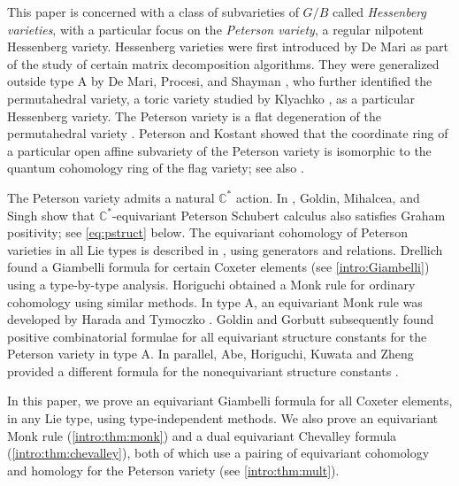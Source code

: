 \documentclass[10pt]{article}
\numberwithin{thm}{section}
\theoremstyle{definition}
\theoremstyle{remark}
\newcommand{\IC}{\mathbb C}
\begin{document}
This paper is concerned with a class of subvarieties of $G/B$  called {\em Hessenberg varieties}, with a particular focus  on the {\em Peterson variety}, a regular nilpotent Hessenberg variety.
Hessenberg varieties were first introduced by De Mari \cite{MR2636295} as part of the study of certain matrix decomposition algorithms.
They were generalized outside type A by De Mari, Procesi, and Shayman \cite{MR1043857},
who further identified the permutahedral variety, a toric variety studied by Klyachko \cite{klyachko85,klyachko95}, as a particular Hessenberg variety.
The Peterson variety is a flat degeneration of the permutahedral variety \cite{abe.fujita.zeng, MR2609167}.
Peterson \cite{peterson:notes} and Kostant \cite{kostant:flag} showed that the coordinate ring of a particular open affine subvariety of the Peterson variety is isomorphic to the quantum cohomology ring of the flag variety; see also \cite{rietsch:totally}.


The Peterson variety admits a natural $\IC^*$ action.
In \cite{gms:peterson}, Goldin, Mihalcea, and Singh show that $\IC^*$-equivariant Peterson Schubert calculus also satisfies Graham positivity; see \cref{eq:pstruct} below.
The equivariant cohomology of Peterson varieties in all Lie types is described in \cite{harada.horiguchi.masuda:Peterson}, using generators and relations.
Drellich \cite{drellich:monk} found a Giambelli formula for certain Coxeter elements (see \cref{intro:Giambelli}) using a type-by-type analysis.
Horiguchi \cite{horiguchi2021mixed} obtained a Monk rule for ordinary cohomology using similar methods.
In type A, an equivariant Monk rule was developed by Harada and Tymoczko \cite{harada.tymoczko:Monk}. Goldin and Gorbutt \cite{goldin.gorbutt:PetSchubCalc} subsequently found positive combinatorial formulae for all equivariant structure constants for the Peterson variety in type A. In parallel, Abe, Horiguchi, Kuwata and Zheng provided a different formula for the nonequivariant structure constants \cite{AbHoKuZe}.
 
In this paper, we prove an equivariant Giambelli formula for all Coxeter elements, in any Lie type, using type-independent methods.
We also prove an equivariant Monk rule (\cref{intro:thm:monk}) and a dual equivariant Chevalley formula (\cref{intro:thm:chevalley}), both of which use a pairing of equivariant cohomology and homology for the Peterson variety (see \cref{intro:thm:mult}). 
 
\end{document}
